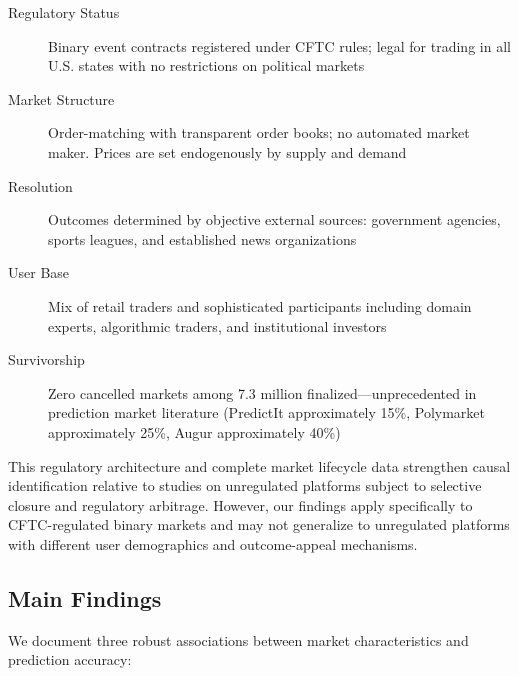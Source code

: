 \begin{description}
\item[Regulatory Status] Binary event contracts registered under CFTC rules; legal for trading in all U.S. states with no restrictions on political markets
\item[Market Structure] Order-matching with transparent order books; no automated market maker. Prices are set endogenously by supply and demand
\item[Resolution] Outcomes determined by objective external sources: government agencies, sports leagues, and established news organizations
\item[User Base] Mix of retail traders and sophisticated participants including domain experts, algorithmic traders, and institutional investors
\item[Survivorship] Zero cancelled markets among 7.3 million finalized---unprecedented in prediction market literature (PredictIt approximately 15\%, Polymarket approximately 25\%, Augur approximately 40\%)
\end{description}

This regulatory architecture and complete market lifecycle data strengthen causal identification relative to studies on unregulated platforms subject to selective closure and regulatory arbitrage. However, our findings apply specifically to CFTC-regulated binary markets and may not generalize to unregulated platforms with different user demographics and outcome-appeal mechanisms.

\subsection{Main Findings}
\label{subsec:mainfindings}

We document three robust associations between market characteristics and prediction accuracy:

